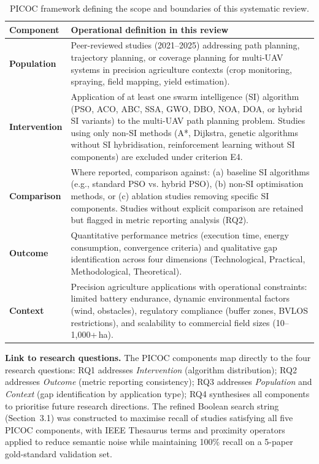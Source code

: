 \documentclass[review,3p,times]{elsarticle}
\begin{document}
\begin{table}[htbp]
\centering
\caption{PICOC framework defining the scope and boundaries of this systematic review.}
\label{tab:picoc}
\begin{tabularx}{\textwidth}{lX}
\toprule
\textbf{Component} & \textbf{Operational definition in this review} \\
\midrule
\textbf{Population} & Peer-reviewed studies (2021--2025) addressing path planning, trajectory planning, or coverage planning for multi-UAV systems in precision agriculture contexts (crop monitoring, spraying, field mapping, yield estimation). \\
\textbf{Intervention} & Application of at least one swarm intelligence (SI) algorithm (PSO, ACO, ABC, SSA, GWO, DBO, NOA, DOA, or hybrid SI variants) to the multi-UAV path planning problem. Studies using only non-SI methods (A*, Dijkstra, genetic algorithms without SI hybridisation, reinforcement learning without SI components) are excluded under criterion E4. \\
\textbf{Comparison} & Where reported, comparison against: (a) baseline SI algorithms (e.g., standard PSO vs. hybrid PSO), (b) non-SI optimisation methods, or (c) ablation studies removing specific SI components. Studies without explicit comparison are retained but flagged in metric reporting analysis (RQ2). \\
\textbf{Outcome} & Quantitative performance metrics (execution time, energy consumption, convergence criteria) and qualitative gap identification across four dimensions (Technological, Practical, Methodological, Theoretical). \\
\textbf{Context} & Precision agriculture applications with operational constraints: limited battery endurance, dynamic environmental factors (wind, obstacles), regulatory compliance (buffer zones, BVLOS restrictions), and scalability to commercial field sizes (10--1,000+\,ha). \\
\bottomrule
\end{tabularx}
\end{table}

\noindent\textbf{Link to research questions.} The PICOC components map directly to the four research questions: RQ1 addresses \textit{Intervention} (algorithm distribution); RQ2 addresses \textit{Outcome} (metric reporting consistency); RQ3 addresses \textit{Population} and \textit{Context} (gap identification by application type); RQ4 synthesises all components to prioritise future research directions. The refined Boolean search string (Section~3.1) was constructed to maximise recall of studies satisfying all five PICOC components, with IEEE Thesaurus terms and proximity operators applied to reduce semantic noise while maintaining 100\% recall on a 5-paper gold-standard validation set.
\end{document}
